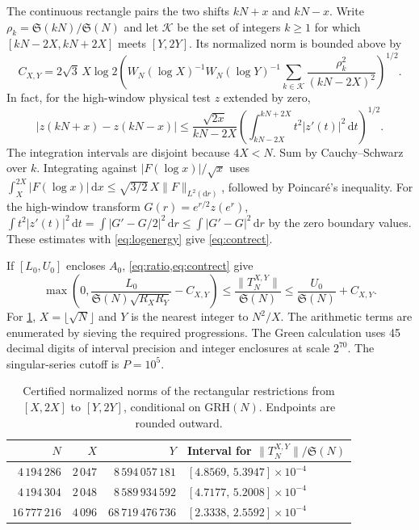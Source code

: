 \documentclass[11pt,a4paper]{article}
\numberwithin{equation}{section}
\newcommand{\SSS}{\mathfrak S}
\newcommand{\grh}{\mathrm{GRH}}
\newcommand{\ud}{\mathrm d}
\newcommand{\Trect}{T_N^{X,Y}}
\begin{document}
The continuous rectangle pairs the two shifts $kN+x$ and $kN-x$. Write
$\rho_k=\SSS(kN)/\SSS(N)$ and let $\mathcal K$ be the set of integers
$k\ge1$ for which $[kN-2X,kN+2X]$ meets $[Y,2Y]$. Its normalized norm
is bounded above by
\begin{equation}
  C_{X,Y}=2\sqrt3\,X\log 2
    \left(W_N(\log X)^{-1}W_N(\log Y)^{-1}
                 \sum_{k\in\mathcal K}\frac{\rho_k^2}{(kN-2X)^2}\right)^{1/2}.
  \label{eq:contrect}
\end{equation}
In fact, for the high-window physical test $z$ extended by zero,
\[
 |z(kN+x)-z(kN-x)|
  \le\frac{\sqrt{2x}}{kN-2X}
       \left(\int_{kN-2X}^{kN+2X}t^2|z'(t)|^2\,\ud t\right)^{1/2}.
\]
The integration intervals are disjoint because $4X<N$. Sum by
Cauchy--Schwarz over $k$. Integrating against
$|F(\log x)|/\sqrt{x}$ uses
$\int_X^{2X}|F(\log x)|\,\ud x\le\sqrt{3/2}\,X\|F\|_{L^2(\ud r)}$,
followed by Poincar\'e's inequality. For the high-window transform
$G(r)=e^{r/2}z(e^r)$,
$\int t^2|z'(t)|^2\,\ud t=\int |G'-G/2|^2\,\ud r
\le\int |G'-G|^2\,\ud r$ by the zero boundary values.
These estimates with \cref{eq:logenergy} give \cref{eq:contrect}.

If $[L_0,U_0]$ encloses $A_0$, \cref{eq:ratio,eq:contrect} give
\begin{equation}
  \max\left(0,\frac{L_0}{\SSS(N)\sqrt{R_XR_Y}}-C_{X,Y}\right)
  \le\frac{\|\Trect\|}{\SSS(N)}
  \le\frac{U_0}{\SSS(N)}+C_{X,Y}.
  \label{eq:rectbounds}
\end{equation}
For \cref{tab:rect}, $X=\lfloor\sqrt N\rfloor$ and $Y$ is the
nearest integer to $N^2/X$. The arithmetic terms are enumerated
by sieving the required progressions. The Green calculation uses
45 decimal digits of interval precision and integer enclosures at
scale $2^{70}$. The singular-series cutoff is $P=10^5$.

\begin{table}[htbp]
\centering
\caption{Certified normalized norms of the rectangular restrictions
from $[X,2X]$ to $[Y,2Y]$, conditional on $\grh(N)$.
Endpoints are rounded outward.}
\label{tab:rect}
\small
\begin{tabular}{@{}r r r l@{}}
\toprule
$N$ & $X$ & $Y$ & Interval for $\|\Trect\|/\SSS(N)$\\
\midrule
$4\,194\,286$  & $2\,047$ & $8\,594\,057\,181$  & $[4.8569,\,5.3947]\times10^{-4}$\\
$4\,194\,304$  & $2\,048$ & $8\,589\,934\,592$  & $[4.7177,\,5.2008]\times10^{-4}$\\
$16\,777\,216$ & $4\,096$ & $68\,719\,476\,736$ & $[2.3338,\,2.5592]\times10^{-4}$\\
\bottomrule
\end{tabular}
\end{table}
\end{document}
